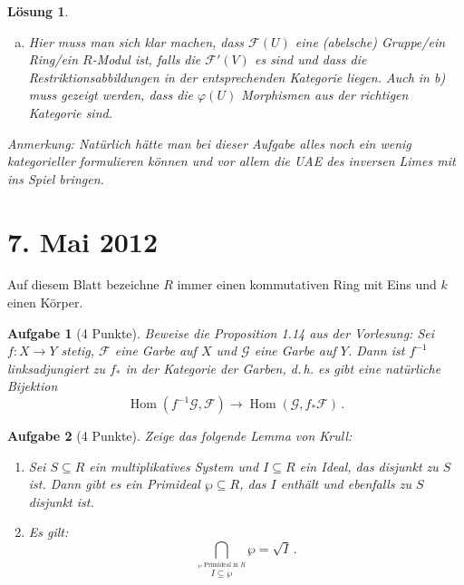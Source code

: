 \documentclass[paper = A4, fontsize=12pt, numbers=noendperiod, chapterprefix=true]{scrbook}
\theoremstyle{break}
\newtheorem{Aufg}{Aufgabe}
\newtheorem{Loes}{L\"osung}
\theoremstyle{nonumberbreak}
\theoremstyle{nonumberplain}
\DeclareMathOperator{\Hom}{Hom}
\newcommand{\F}{\mathcal{F}} %
\newcommand{\G}{\mathcal{G}} %
\begin{document}
\begin{Loes}
\begin{enumerate}[a)]
Sei $f \in \F(U)$. F\"ur alle $V \subseteq U, V \in \mathcal{B}$ sind die Schnitte $\rho^U_V(\varphi(U)(f)) = \varphi(V)(\rho^U_V(f)) \in \G(V)$ festgelegt und bilden eine konsistente Familie in $\G$. Da $\G$ eine Garbe ist, ist $\varphi(U)(f) \in \G(U)$ damit eindeutig bestimmt.

Ist $U' \subseteq U \subseteq X$ offen, dann ist jedes $V \subseteq U', V \in \mathcal{B}$ auch in $U$ enthalten. Es gilt $\rho^{U'}_V(\rho^U_{U'}(\varphi(U)(f))) = \rho^U_V(\varphi(U)(f)) = \varphi(V)(\rho^U_V(f))$, also ist $\rho^U_{U'}(\varphi(U)(f))$ ein Amalgam f\"ur die $\varphi(V)(\rho^U_V(f))$ und es gilt $\rho^U_{U'}(\varphi(U)(f)) = \varphi(U')(\rho^U_ {U'}(f))$. 

\item Hier muss man sich klar machen, dass $\F(U)$ eine (abelsche) Gruppe/ein Ring/ein $R$-Modul ist, falls die $\F'(V)$ es sind und dass die Restriktionsabbildungen in der entsprechenden Kategorie liegen. Auch in b) muss gezeigt werden, dass die $\varphi(U)$ Morphismen aus der richtigen Kategorie sind.
\end{enumerate}

\textit{Anmerkung:} Nat\"urlich h\"atte man bei dieser Aufgabe alles noch ein wenig kategorieller formulieren k\"onnen und vor allem die UAE des inversen Limes mit ins Spiel bringen.
\end{Loes}

\newpage
\section{7. Mai 2012}
\setcounter{Aufg}{0}
\setcounter{Loes}{0}

Auf diesem Blatt bezeichne $R$ immer einen kommutativen Ring mit Eins und $k$ einen %
K\"orper.

\begin{Aufg}[4 Punkte]
 Beweise die Proposition 1.14 aus der Vorlesung:
Sei $f\colon X\to Y$ stetig, $\mathcal{F}$ eine Garbe auf $X$ und $\G$ eine Garbe auf $Y$.
Dann ist $f^{-1}$ linksadjungiert zu $f_\ast$ in der Kategorie der Garben, d.\,h. es gibt eine nat\"urliche Bijektion 
$$\Hom(f^{-1}\G, \F) \to \Hom(\G, f_\ast \F) \,.$$
\end{Aufg}

 
\begin{Aufg}[4 Punkte]
Zeige das folgende Lemma von Krull:
\begin{enumerate}%
 \item Sei $S \subseteq R$ ein multiplikatives System und $I \subseteq R$ ein Ideal, das disjunkt zu $S$ ist.
Dann gibt es ein Primideal $\wp \subseteq R$, das $I$ enth\"alt und ebenfalls zu $S$ disjunkt ist.
 \item Es gilt: $$\bigcap_{\stackrel{\wp \textrm{ Primideal in } R}{I \subseteq \wp}} \wp = \sqrt{I}\,.$$
\end{enumerate}
\end{Aufg}
\end{document}
